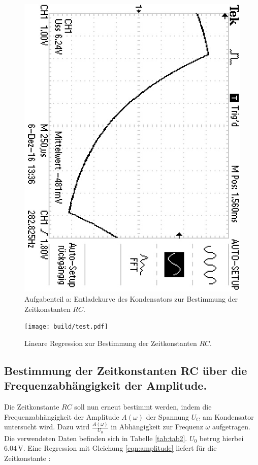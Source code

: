 \begin{figure}
	\centering
	\includegraphics[angle=90]{bilder/F0000TEK.JPG}
	\caption{Aufgabenteil a: Entladekurve des Kondensators zur Bestimmung der Zeitkonstanten $RC$.}
	\label{fig:plotrc}
\end{figure}

\begin{figure}
	\centering
	\texttt{[image: build/test.pdf]}
	\caption{Lineare Regression zur Bestimmung der Zeitkonstanten $RC$.}
	\label{fig:plota}
\end{figure}

\subsection{Bestimmung der Zeitkonstanten RC über die Frequenzabhängigkeit der Amplitude.}
Die Zeitkonstante $RC$ soll nun erneut bestimmt werden, indem die Frequenzabhängigkeit der Amplitude $A(\omega)$ der Spannung $U_\text{C}$ am Kondensator untersucht wird.
Dazu wird $\frac{A(\omega)}{U_\text{0}}$ in Abhängigkeit zur Frequenz $\omega$ aufgetragen. Die verwendeten Daten befinden sich in Tabelle \ref{tab:tab2}.
$U_{\mathrm{0}}$ betrug hierbei $6.04 \,\si{\volt}$.
Eine Regression mit Gleichung \eqref{eqn:amplitude} liefert für die Zeitkonstante :

